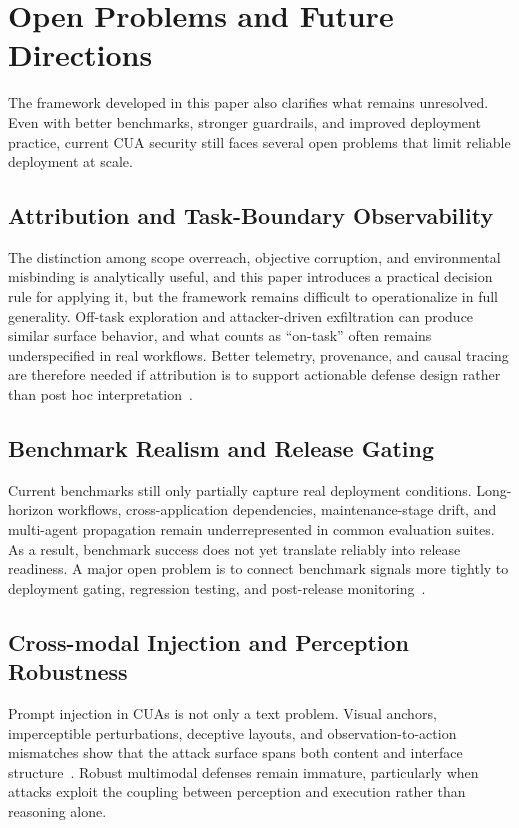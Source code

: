 \section{Open Problems and Future Directions}
\label{sec:limitations}

The framework developed in this paper also clarifies what remains unresolved. Even with better benchmarks, stronger guardrails, and improved deployment practice, current CUA security still faces several open problems that limit reliable deployment at scale.

\subsection{Attribution and Task-Boundary Observability}
The distinction among scope overreach, objective corruption, and environmental misbinding is analytically useful, and this paper introduces a practical decision rule for applying it, but the framework remains difficult to operationalize in full generality. Off-task exploration and attacker-driven exfiltration can produce similar surface behavior, and what counts as ``on-task'' often remains underspecified in real workflows. Better telemetry, provenance, and causal tracing are therefore needed if attribution is to support actionable defense design rather than post hoc interpretation~\cite{jones2025systematization,foerster2026camels}.

\subsection{Benchmark Realism and Release Gating}
Current benchmarks still only partially capture real deployment conditions. Long-horizon workflows, cross-application dependencies, maintenance-stage drift, and multi-agent propagation remain underrepresented in common evaluation suites. As a result, benchmark success does not yet translate reliably into release readiness. A major open problem is to connect benchmark signals more tightly to deployment gating, regression testing, and post-release monitoring~\cite{kuntz2025harm,tian2025measuring,chen2026lps,zheng2026riskybench,wang2026pasb}.

\subsection{Cross-modal Injection and Perception Robustness}
Prompt injection in CUAs is not only a text problem. Visual anchors, imperceptible perturbations, deceptive layouts, and observation-to-action mismatches show that the attack surface spans both content and interface structure~\cite{liu2025wainjectbench,zhang2026realistic,qian2026zero}. Robust multimodal defenses remain immature, particularly when attacks exploit the coupling between perception and execution rather than reasoning alone.

